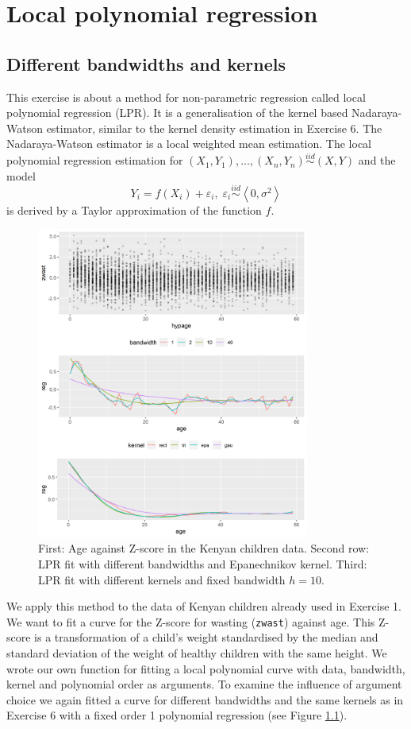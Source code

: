 \chapter{Local polynomial regression}
\section{Different bandwidths and kernels}
This exercise is about a method for non-parametric regression called local polynomial regression (LPR). It is a generalisation of the kernel based Nadaraya-Watson estimator, similar to the kernel density estimation in Exercise 6. The Nadaraya-Watson estimator is a local weighted mean estimation. The local polynomial regression estimation for $(X_1,Y_1),...,(X_n,Y_n)\stackrel{iid}{\sim}(X,Y)$ and the model $$Y_i=f(X_i)+\varepsilon_i, \; \varepsilon_i \stackrel{iid}{\sim}\left\langle0,\sigma^2\right\rangle$$ is derived by a Taylor approximation of the function $f$. 
\begin{figure}[!htb]
\centering
\includegraphics[width=0.8\textwidth, keepaspectratio]{ex9/polyfits.png}
\caption{First: Age against Z-score in the Kenyan children data. Second row: LPR fit with different bandwidths and Epanechnikov kernel. Third: LPR fit with different kernels and fixed bandwidth $h=10$.}
\label{7fits}
\end{figure}

We apply this method to the data of Kenyan children already used in Exercise 1. We want to fit a curve for the Z-score for wasting (\texttt{zwast}) against age. This Z-score is a transformation of a child's weight standardised by the median and standard deviation of the weight of healthy children with the same height. We wrote our own function for fitting a local polynomial curve with data, bandwidth, kernel and polynomial order as arguments. To examine the influence of argument choice we again fitted a curve for different bandwidths and the same kernels as in Exercise 6 with a fixed order 1 polynomial regression (see Figure \ref{7fits}).

